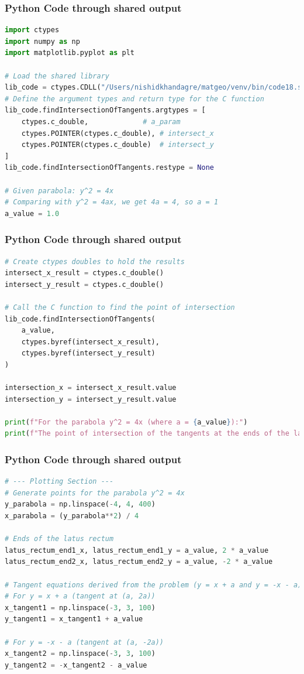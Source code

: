\documentclass{beamer}
\begin{document}
\begin{frame}[fragile]
\frametitle{Python Code through shared output}
\begin{lstlisting}[language=Python]
import ctypes
import numpy as np
import matplotlib.pyplot as plt

# Load the shared library
lib_code = ctypes.CDLL("/Users/nishidkhandagre/matgeo/venv/bin/code18.so")
# Define the argument types and return type for the C function
lib_code.findIntersectionOfTangents.argtypes = [
    ctypes.c_double,             # a_param
    ctypes.POINTER(ctypes.c_double), # intersect_x
    ctypes.POINTER(ctypes.c_double)  # intersect_y
]
lib_code.findIntersectionOfTangents.restype = None

# Given parabola: y^2 = 4x
# Comparing with y^2 = 4ax, we get 4a = 4, so a = 1
a_value = 1.0
\end{lstlisting}
\end{frame}

\begin{frame}[fragile]
\frametitle{Python Code through shared output}
\begin{lstlisting}[language=Python]
# Create ctypes doubles to hold the results
intersect_x_result = ctypes.c_double()
intersect_y_result = ctypes.c_double()

# Call the C function to find the point of intersection
lib_code.findIntersectionOfTangents(
    a_value,
    ctypes.byref(intersect_x_result),
    ctypes.byref(intersect_y_result)
)

intersection_x = intersect_x_result.value
intersection_y = intersect_y_result.value

print(f"For the parabola y^2 = 4x (where a = {a_value}):")
print(f"The point of intersection of the tangents at the ends of the latus rectum is ({intersection_x:.2f}, {intersection_y:.2f})")
\end{lstlisting}
\end{frame}

\begin{frame}[fragile]
\frametitle{Python Code through shared output}
\begin{lstlisting}[language=Python]
# --- Plotting Section ---
# Generate points for the parabola y^2 = 4x
y_parabola = np.linspace(-4, 4, 400)
x_parabola = (y_parabola**2) / 4

# Ends of the latus rectum
latus_rectum_end1_x, latus_rectum_end1_y = a_value, 2 * a_value
latus_rectum_end2_x, latus_rectum_end2_y = a_value, -2 * a_value

# Tangent equations derived from the problem (y = x + a and y = -x - a)
# For y = x + a (tangent at (a, 2a))
x_tangent1 = np.linspace(-3, 3, 100)
y_tangent1 = x_tangent1 + a_value

# For y = -x - a (tangent at (a, -2a))
x_tangent2 = np.linspace(-3, 3, 100)
y_tangent2 = -x_tangent2 - a_value
\end{lstlisting}
\end{frame}
\end{document}
